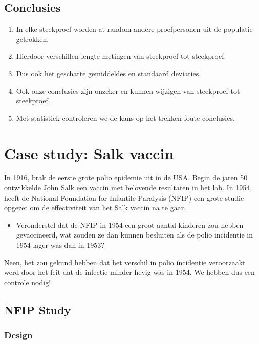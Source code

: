 \documentclass[
  12pt,dutch,coursenotes]{book}
\providecommand{\tightlist}{%
  \setlength{\itemsep}{0pt}\setlength{\parskip}{0pt}}
\theoremstyle{definition}
\theoremstyle{definition}
\theoremstyle{definition}
\theoremstyle{definition}
\theoremstyle{remark}
\begin{document}
\hypertarget{conclusies}{%
\subsection{Conclusies}\label{conclusies}}

\begin{enumerate}
\def\labelenumi{\arabic{enumi}.}
\item
  In elke steekproef worden at random andere proefpersonen uit de populatie getrokken.
\item
  Hierdoor verschillen lengte metingen van steekproef tot steekproef.
\item
  Dus ook het geschatte gemiddeldes en standaard deviaties.
\item
  Ook onze conclusies zijn onzeker en kunnen wijzigen van steekproef tot steekproef.
\item
  Met statistiek controleren we de kans op het trekken foute conclusies.
\end{enumerate}

\hypertarget{case-study-salk-vaccin}{%
\section{Case study: Salk vaccin}\label{case-study-salk-vaccin}}

In 1916, brak de eerste grote polio epidemie uit in de USA.
Begin de jaren 50 ontwikkelde John Salk een vaccin met belovende resultaten in het lab.
In 1954, heeft de National Foundation for Infantile Paralysis (NFIP) een grote studie opgezet om de effectiviteit van het Salk vaccin na te gaan.

\begin{itemize}
\tightlist
\item
  Veronderstel dat de NFIP in 1954 een groot aantal kinderen zou hebben gevaccineerd, wat zouden ze dan kunnen besluiten als de polio incidentie in 1954 lager was dan in 1953?
\end{itemize}

Neen, het zou gekund hebben dat het verschil in polio incidentie veroorzaakt werd door het feit dat de infectie minder hevig was in 1954.
We hebben dus een controle nodig!

\hypertarget{nfip-study}{%
\subsection{NFIP Study}\label{nfip-study}}

\hypertarget{design}{%
\subsubsection{Design}\label{design}}
\end{document}
